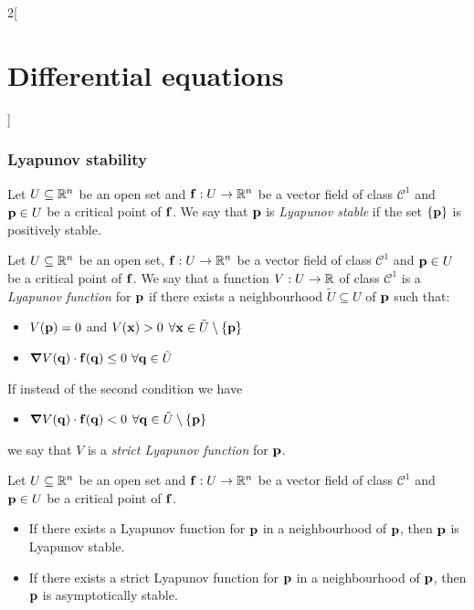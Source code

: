 \documentclass[../../../main_math.tex]{subfiles}
\begin{document}
\begin{multicols}{2}[\section{Differential equations}]
  \subsubsection{Lyapunov stability}
  \begin{definition}
    Let $U\subseteq \mathbb{R}^n$ be an open set and $\boldsymbol{\mathrm{f}}:U\rightarrow\mathbb{R}^n$ be a vector field of class $\mathcal{C}^1$ and $\boldsymbol{\mathrm{p}}\in U$ be a critical point of $\boldsymbol{\mathrm{f}}$. We say that $\boldsymbol{\mathrm{p}}$ is \emph{Lyapunov stable} if the set $\{\boldsymbol{\mathrm{p}}\}$ is positively stable.
  \end{definition}
  \begin{definition}
    Let $U\subseteq \mathbb{R}^n$ be an open set, $\boldsymbol{\mathrm{f}}:U\rightarrow\mathbb{R}^n$ be a vector field of class $\mathcal{C}^1$ and $\boldsymbol{\mathrm{p}}\in U$ be a critical point of $\boldsymbol{\mathrm{f}}$. We say that a function $V:U\rightarrow\mathbb{R}$ of class $\mathcal{C}^1$ is a \emph{Lyapunov function} for $\boldsymbol{\mathrm{p}}$ if there exists a neighbourhood $\tilde{U}\subseteq U$ of $\boldsymbol{\mathrm{p}}$ such that:
    \begin{itemize}
      \item $V(\boldsymbol{\mathrm{p}})=0$ and $V(\boldsymbol{\mathrm{x}})>0$ $\forall \boldsymbol{\mathrm{x}}\in\tilde{U}\setminus\{\boldsymbol{\mathrm{p}}\}$
      \item $\grad V(\boldsymbol{\mathrm{q}})\cdot \boldsymbol{\mathrm{f}}(\boldsymbol{\mathrm{q}})\leq 0$ $\forall \boldsymbol{\mathrm{q}}\in \tilde{U}$
    \end{itemize}
    If instead of the second condition we have
    \begin{itemize}
      \item $\grad V(\boldsymbol{\mathrm{q}})\cdot \boldsymbol{\mathrm{f}}(\boldsymbol{\mathrm{q}})<0$ $\forall \boldsymbol{\mathrm{q}}\in \tilde{U}\setminus\{\boldsymbol{\mathrm{p}}\}$
    \end{itemize}
    we say that $V$ is a \emph{strict Lyapunov function} for $\boldsymbol{\mathrm{p}}$.
  \end{definition}
  \begin{theorem}
    Let $U\subseteq \mathbb{R}^n$ be an open set and $\boldsymbol{\mathrm{f}}:U\rightarrow\mathbb{R}^n$ be a vector field of class $\mathcal{C}^1$ and $\boldsymbol{\mathrm{p}}\in U$ be a critical point of $\boldsymbol{\mathrm{f}}$.
    \begin{itemize}
      \item If there exists a Lyapunov function for $\boldsymbol{\mathrm{p}}$ in a neighbourhood of $\boldsymbol{\mathrm{p}}$, then $\boldsymbol{\mathrm{p}}$ is Lyapunov stable.
      \item If there exists a strict Lyapunov function for $\boldsymbol{\mathrm{p}}$ in a neighbourhood of $\boldsymbol{\mathrm{p}}$, then $\boldsymbol{\mathrm{p}}$ is asymptotically stable.
    \end{itemize}
  \end{theorem}
  \begin{theorem}

\end{theorem}
\end{multicols}
\end{document}

